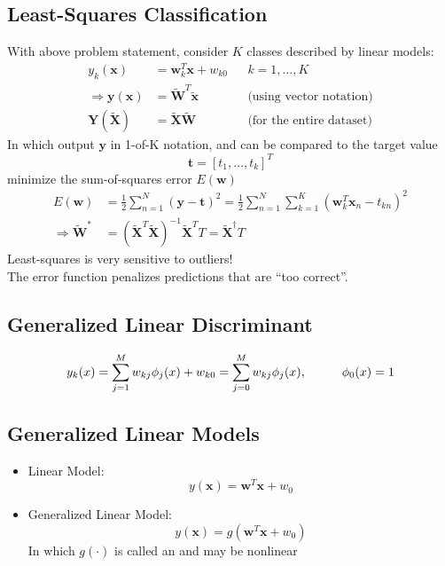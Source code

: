 \subsection{Least-Squares Classification}
With above problem statement, consider $K$ classes described by linear models:
\begin{align*}
	y_k(\textbf{x}) &= \textbf{w}^T_k\textbf{x} + w_{k0} && k=1, \dots, K \\
	\Rightarrow \textbf{y}(\textbf{x}) &= \widetilde{\textbf{W}}^T\widetilde{\textbf{x}} && \text{(using vector notation)} \\
	\textbf{Y}(\widetilde{\textbf{X}}) &= \widetilde{\textbf{X}}\widetilde{\textbf{W}} && \text{(for the entire dataset)}
\end{align*}
In which output $\textbf{y}$ in 1-of-K notation, and can be compared to the target value
\[\textbf{t}=[t_1, \dots, t_k]^T\]
 minimize the sum-of-squares error $E(\textbf{w})$
\begin{align*}
	E(\textbf{w}) &= \frac{1}{2} \sum_{n=1}^{N} \left(\textbf{y} - \textbf{t}\right)^2 = 
	\frac{1}{2} \sum_{n=1}^{N} \sum_{k=1}^{K} \left(\textbf{w}_k^T\textbf{x}_n-t_{kn}\right)^2 \\
	\Rightarrow \widetilde{\textbf{W}}^* &=  \left( \widetilde{\textbf{X}}^T \widetilde{\textbf{X}} \right)^{-1} \widetilde{\textbf{X}}^T T = \widetilde{\textbf{X}}^\dagger T
\end{align*}
\note Least-squares is very sensitive to outliers!\\
The error function penalizes predictions that are “too correct”.

\subsection{Generalized Linear Discriminant}
\begin{equation}
	y_k(x) = \sum_{j=1}^{M}w_{kj}\phi_j(x) + w_{k0} = \sum_{j=0}^M w_{kj}\phi_j(x), \hspace*{1cm} \phi_0(x) = 1
\end{equation}

\subsection{Generalized Linear Models}
\begin{itemize}
	\item Linear Model:
	\begin{equation}
		y(\textbf{x}) = \textbf{w}^T\textbf{x} + w_0
	\end{equation}	
	\item Generalized Linear Model:
	\begin{equation}
		y(\textbf{x}) = g(\textbf{w}^T\textbf{x} + w_0)
		\label{eq:generalized-linear-model}
	\end{equation}	
	In which $g(\cdot)$ is called an  and may be nonlinear
\end{itemize}

